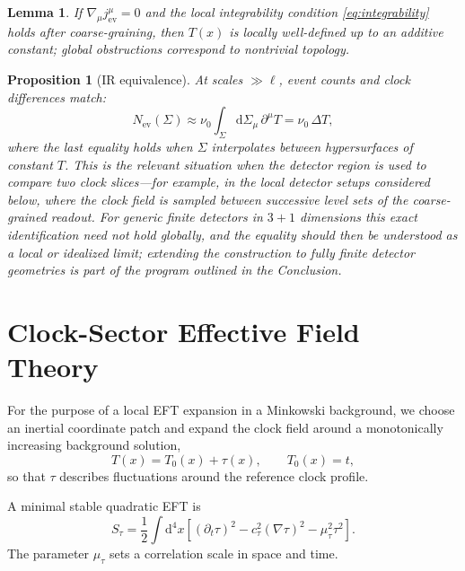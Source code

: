 \documentclass[pdflatex,sn-mathphys-num]{sn-jnl}
\theoremstyle{thmstylethree}
\newtheorem{lemma}{Lemma}[section]
\theoremstyle{thmstyleone}
\newtheorem{proposition}{Proposition}[section]
\theoremstyle{thmstyletwo}
\numberwithin{equation}{section}
\newcommand{\dd}{\mathrm{d}}
\newcommand{\Sig}{\Sigma}
\newcommand{\Jev}{j^\mu_{\mathrm{ev}}}
\newcommand{\Nev}{N_{\mathrm{ev}}}
\begin{document}
    \begin{lemma}
        If $\nabla_\mu \Jev =0$ and the local integrability condition \eqref{eq:integrability} holds after coarse-graining, then $T(x)$ is locally well-defined up to an additive constant; global obstructions correspond to nontrivial topology.
    \end{lemma}
    
    \begin{proposition}[IR equivalence]
At scales $\gg \ell$, event counts and clock differences match:
\begin{equation}
    \Nev(\Sig)\approx \nu_0 \int_\Sig \dd\Sigma_\mu\,\partial^\mu T
    = \nu_0\,\Delta T,
\end{equation}
where the last equality holds when $\Sigma$ interpolates between hypersurfaces of constant $T$. This is the relevant situation when the detector region is used to compare two clock slices---for example, in the local detector setups considered below, where the clock field is sampled between successive level sets of the coarse-grained readout. For generic finite detectors in $3+1$ dimensions this exact identification need not hold globally, and the equality should then be understood as a local or idealized limit; extending the construction to fully finite detector geometries is part of the program outlined in the Conclusion.
    \end{proposition}

    \section{Clock-Sector Effective Field Theory}
    
    For the purpose of a local EFT expansion in a Minkowski background, we choose an inertial coordinate patch and expand the clock field around a monotonically increasing background solution,
    \begin{equation}
        T(x)=T_0(x)+\tau(x), \qquad T_0(x)=t,
    \end{equation}
    so that $\tau$ describes fluctuations around the reference clock profile.
    
    A minimal stable quadratic EFT is
    \begin{equation}
        S_\tau = \frac{1}{2}\int \dd^4x
        \left[
            (\partial_t\tau)^2
        - c_\tau^2(\nabla\tau)^2
        - \mu_\tau^2 \tau^2
        \right].
        \label{eq:clockEFT}
    \end{equation}
    The parameter $\mu_\tau$ sets a correlation scale in space and time.
    
\end{document}
